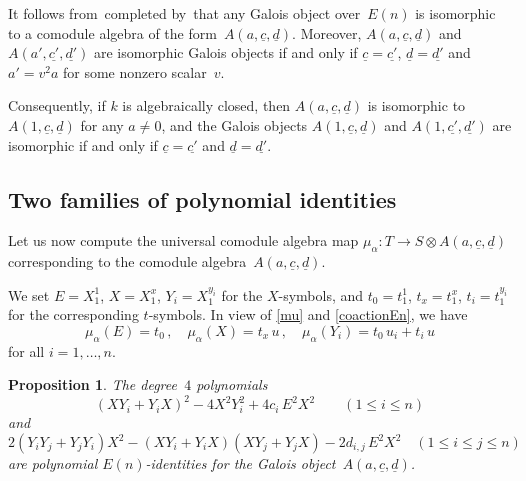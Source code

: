 \documentclass[11pt, a4paper]{amsart}
\newtheorem{prop}[theorem]{Proposition}
\theoremstyle{definition}
\numberwithin{equation}{section}
\begin{document}
It follows from\,\cite[Sect.\,4]{PvO} completed by\,\cite[Sect.\,2]{Ne} 
that any Galois object over~$E(n)$ is isomorphic to a comodule algebra
of the form~$A(a,\underline{c}, \underline{d})$. Moreover, 
$A(a,\underline{c}, \underline{d})$ and $A(a',\underline{c'}, \underline{d'})$ are isomorphic Galois objects
if and only if $\underline{c} = \underline{c'}$, $\underline{d} = \underline{d'}$ and $a' = v^2a$ for some
nonzero scalar~$v$. 

Consequently, if $k$ is algebraically closed, then $A(a,\underline{c}, \underline{d})$ is isomorphic to 
$A(1,\underline{c}, \underline{d})$ for any $a\neq 0$, 
and the Galois objects $A(1,\underline{c}, \underline{d})$ and $A(1,\underline{c'}, \underline{d'})$ are isomorphic
if and only if $\underline{c} = \underline{c'}$ and $\underline{d} = \underline{d'}$.

\subsection{Two families of polynomial identities}\label{ssec-PI-En}

Let us now compute the universal comodule algebra map
$\mu_{\alpha} : T \to S \otimes A(a,\underline{c}, \underline{d})$ 
corresponding to the comodule algebra~$A(a,\underline{c}, \underline{d})$.

We set $E = X_1^1$, $X = X_1^x$, $Y_i= X_1^{y_i}$ for the $X$-symbols, and 
$t_0 = t_1^1$, $t_x= t_1^x$, $t_i= t_1^{y_i}$ for the corresponding $t$-symbols. 
In view of \eqref{mu} and \eqref{coactionEn},
we have
\begin{equation}\label{mu-En}
\mu_{\alpha}(E) = t_0 \, , \quad \mu_{\alpha}(X) = t_x \, u \, , \quad \mu_{\alpha}(Y_i) = t_0\, u_i + t_i \, u 
\end{equation}
for all $i= 1, \ldots, n$.

\begin{prop}\label{prop3}
The degree~$4$ polynomials
\begin{equation*}
(XY_i+Y_iX)^2 - 4 X^2 Y_i^2 + 4c_i\, E^2 X^2 \qquad (1\leq i \leq n)
\end{equation*}
and
\begin{equation*}
2 (Y_iY_j + Y_jY_i)X^2 - (XY_i+Y_iX)(XY_j+Y_jX) -  2d_{i,j}\, E^2 X^2 \quad (1\leq i \leq j \leq n)
\end{equation*}
are polynomial $E(n)$-identities for the Galois object~$A(a,\underline{c}, \underline{d})$.
\end{prop}
\end{document}
